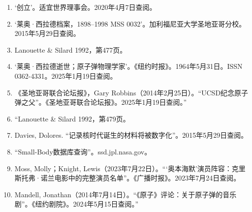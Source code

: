 \begin{enumerate}
\item ‘创立’。适宜世界理事会。2020年4月7日查阅。  
\item ‘莱奥·西拉德档案，1898–1998 MSS 0032’。加利福尼亚大学圣地亚哥分校。2015年5月29日查阅。  
\item Lanouette & Silard 1992，第477页。  
\item ‘莱奥·西拉德逝世；原子弹物理学家’。《纽约时报》。1964年5月31日。ISSN 0362-4331。2025年1月19日查阅。  
\item 《圣地亚哥联合论坛报》，Gary Robbins（2014年2月25日）。“UCSD纪念原子弹之父”。《圣地亚哥联合论坛报》。2025年1月19日查阅。”
\item “Lanouette & Silard 1992，第479页。  
\item Davies, Dolores. “记录核时代诞生的材料将被数字化”。2015年5月29日查阅。  
\item “Small-Body数据库查询”。ssd.jpl.nasa.gov。  
\item Moss, Molly；Knight, Lewis（2023年7月22日）。“‘奥本海默’演员阵容：克里斯托弗·诺兰电影中的完整演员名单”。《广播时报》。2023年7月24日查阅。  
\item Mandell, Jonathan（2014年7月14日）。“《原子》评论：关于原子弹的音乐剧”。《纽约剧院》。2024年5月15日查阅。”
\end{enumerate}
